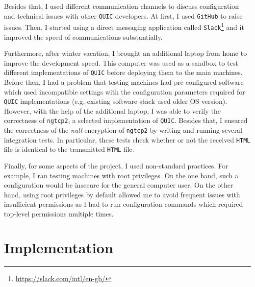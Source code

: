 \documentclass[12pt,a4paper,twoside,openright]{report}
\begin{document}
    Besides that, I used different communication channels to discuss configuration and technical issues with other \texttt{QUIC} developers.
    At first, I used \texttt{GitHub} to raise issues.
    Then, I started using a direct messaging application called \texttt{Slack}\footnote{\url{https://slack.com/intl/en-gb/}} 
    and it improved the speed of communications substantially.

    Furthermore, after winter vacation, I brought an additional laptop from home to improve the development speed.
    This computer was used as a sandbox to test different implementations of \texttt{QUIC} before deploying them to the main machines.
    Before then, I had a problem that testing machines had pre-configured software which used incompatible settings with the configuration parameters required for \texttt{QUIC} implementations (e.g. existing software stack used older OS version).
    However, with the help of the additional laptop, I was able to verify the correctness of \texttt{ngtcp2}, a selected implementation of \texttt{QUIC}.
    Besides that, I ensured the correctness of the \textit{null} encryption of \texttt{ngtcp2} by writing and running several integration tests.
    In particular, these tests check whether or not the received \texttt{HTML} file is identical to the transmitted \texttt{HTML} file.
    
    Finally, for some aspects of the project, I used non-standard practices.
    For example, I ran testing machines with root privileges.
    On the one hand, such a configuration would be insecure for the general computer user. On the other hand, using root privileges by default allowed me to avoid frequent issues with insufficient permissions as I had to run configuration commands which required top-level permissions multiple times.
    
    

\chapter{Implementation}


\end{document}
